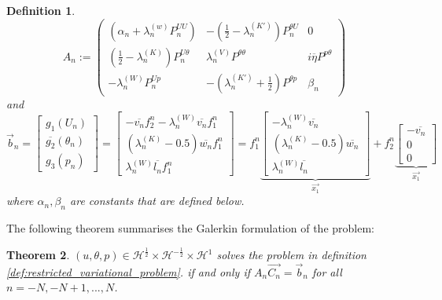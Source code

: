 \documentclass[10pt,journal,compsoc, onecolumn]{IEEEtran}
\newtheorem{theorem}{Theorem}[section]
\newtheorem{definition}[theorem]{Definition}
\begin{document}
\begin{definition}
    \label{def:galerkin_matrix}
    $$
    A_n:= 
    \begin{pmatrix}
        (\alpha_n + \lambda_n^{(w)} P^{UU}_n)  & - (\frac{1}{2} - \lambda_n^{(K')}) P_n^{\theta U} & 0\\
        (\frac{1}{2} - \lambda_n^{(K)})P^{U\theta}_n  & \lambda^{(V)}_n P^{\theta \theta}  &  i \overline{\eta}     P^{p \theta} \\
        -\lambda_n^{(W)} P^{Up}_n  &  - (\lambda^{(K')}_n + \frac{1}{2})  P^{\theta p} & \beta_n 
    \end{pmatrix}
    $$
    and 
    $$
    \vec{b}_n = 
    \begin{bmatrix}
       g_1(U_n)\\
        \overline{g_2}(\theta_n) \\
        g_3(p_n)
    \end{bmatrix}
    = 
    \begin{bmatrix}
        - \overline{{v_n}} f_2^n - \lambda_n^{(W)} \overline{{v_n}} f_1^n \\
        (\lambda_n^{(K)} - 0.5)  \overline{w_n} f_1^n\\
        \lambda_n^{(W)} \overline{l_n} f_1^n
    \end{bmatrix}
= f_1^n 
\underbrace{
\begin{bmatrix}
- \lambda_n^{(W)} \overline{{v_n}} \\
(\lambda_n^{(K)} - 0.5) \overline{w_n}  \\
\lambda_n^{(W)} \overline{l_n}
\end{bmatrix}}_{\vec{x_1}}
+ f_2^n
\underbrace{\begin{bmatrix}
    - \overline{{v_n}} \\
    0 \\
    0
\end{bmatrix}}_{\vec{x_1}}
    $$
    where $\alpha_n, \beta_n$ are constants that are defined below. 
\end{definition}
The following theorem summarises the Galerkin formulation of the problem: 
\begin{theorem}
    \label{def:galerkin_matrix}
    \((u, \theta, p) \in  \mathcal{H}^{\frac{1}{2}} \times \mathcal{H}^{-\frac{1}{2}} \times \mathcal{H}^{1}\) solves the problem in definition \ref{def:restricted_variational_problem}.
    if and only if $A_n\vec{C_n} = \vec{b}_n$ for all  $n = -N, -N + 1, ..., N$. 
\end{theorem}
\end{document}
